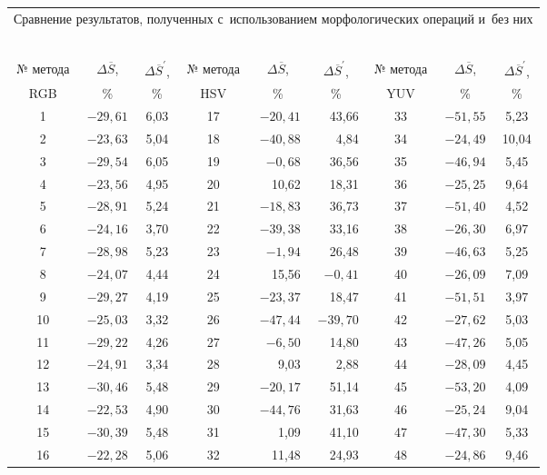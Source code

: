 \begin{multicols}{2}
\begin{table*}[b]\small
\begin{center}
\begin{tabular}{|c|c|c|c|r|r|c|c|c|}
\multicolumn{9}{c}{Сравнение результатов, полученных с~использованием
морфологических операций и~без них}\\
\multicolumn{9}{c}{\ }\\[-4pt]
\hline
&&&&&&&&\\[-9pt]
№ метода&$\Delta \overline{S}$, &$\Delta \overline{S}^\prime$, &№ метода&
\multicolumn{1}{c|}{$\Delta
\overline{S}$,} &\multicolumn{1}{c|}{$\Delta \overline{S}^\prime$,}  &№ метода&
$\Delta \overline{S}$, &$\Delta \overline{S}^\prime$, \\
\cline{1-1}
\cline{4-4}
\cline{7-7}
RGB&\%&\%&HSV&\multicolumn{1}{c|}{\%}&\multicolumn{1}{c|}{\%}&YUV&\%&\%\\
\hline
1&$-29{,}61$ &6,03 &17&$-20{,}41$ &43,66 &33&$-51{,}55$ &5,23\\
2&$-23{,}63$ &5,04 &18&$-40{,}88$ &4,84 &34&$-24{,}49$ &10,04\\
3&$-29{,}54$ &6,05 &19&\cellcolor[gray]{.6}$-0{,}68$ &\cellcolor[gray]{.6}36,56 &35
&$-46{,}94$ &5,45\\
4&$-23{,}56$ &4,95 &20&10,62 &18,31 &36&$-25{,}25$ &9,64\\
5&$-28{,}91$ &5,24 &21&$-18{,}83$ &36,73 &37&$-51{,}40$ &4,52\\
6&$-24{,}16$ &3,70 &22&$-39{,}38$ &33,16 &38&$-26{,}30$ &6,97\\
7&$-28{,}98$ &5,23 &23&\cellcolor[gray]{.6}$-1{,}94$ &\cellcolor[gray]{.6}26,48
&39&$-46{,}63$ &5,25\\
8&$-24{,}07$ &4,44 &24&15,56 &$-0{,}41$ &40&$-26{,}09$ &7,09\\
9&$-29{,}27$ &4,19 &25&$-23{,}37$ &18,47 &41&$-51{,}51$&3,97\\
10\hphantom{9}&$-25{,}03$ &3,32 &26&$-47{,}44$ &$-39{,}70$ &42&$-27{,}62$ &5,03\\
11\hphantom{9}&$-29{,}22$ &4,26 &27&$-6{,}50$ &14,80 &43&$-47{,}26$ &5,05\\
12\hphantom{9}&$-24{,}91$ &3,34 &28&9,03 &2,88 &44&$-28{,}09$ &4,45\\
13\hphantom{9}&$-30{,}46$ &5,48 &29&$-20{,}17$ &51,14 &45&$-53{,}20$ &4,09\\
14\hphantom{9}&$-22{,}53$ &4,90 &30&$-44{,}76$ &31,63 &46&$-25{,}24$ &9,04\\
15\hphantom{9}&$-30{,}39$ &5,48 &31&\cellcolor[gray]{.6}1,09 &\cellcolor[gray]{.6}41,10
&47&$-47{,}30$ &5,33\\
16\hphantom{9}&$-22{,}28$ &5,06 &32&11,48 &24,93 &48&$-24{,}86$ &9,46\\
\hline
\end{tabular}
\end{center}
\end{table*}


\end{multicols}
